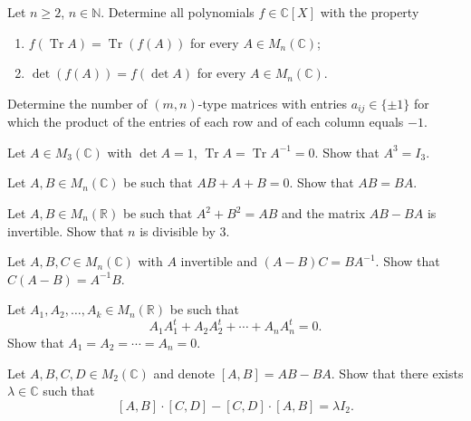 \documentclass[12pt]{article}
\begin{document}
\begin{problem}
Let $n \ge 2$, $n \in \mathbb{N}$. Determine all polynomials $f \in \mathbb{C}[X]$ with the property
\begin{enumerate}[label=(\alph*)]
\item $f(\operatorname{Tr} A) = \operatorname{Tr}(f(A))$ for every $A \in M_n(\mathbb{C})$;
\item $\det(f(A)) = f(\det A)$ for every $A \in M_n(\mathbb{C})$.
\end{enumerate}
\end{problem}

\begin{problem}
Determine the number of $(m,n)$-type matrices with entries $a_{ij} \in \{\pm 1\}$ for which the product of the entries of each row and of each column equals $-1$.
\end{problem}

\begin{problem}
Let $A \in M_3(\mathbb{C})$ with $\det A = 1$, $\operatorname{Tr} A = \operatorname{Tr} A^{-1} = 0$. Show that $A^3 = I_3$.
\end{problem}

\begin{problem}
Let $A, B \in M_n(\mathbb{C})$ be such that $AB + A + B = 0$. Show that $AB = BA$.
\end{problem}

\begin{problem}
Let $A, B \in M_n(\mathbb{R})$ be such that $A^2 + B^2 = AB$ and the matrix $AB - BA$ is invertible. Show that $n$ is divisible by $3$.
\end{problem}

\begin{problem}
Let $A, B, C \in M_n(\mathbb{C})$ with $A$ invertible and $(A-B)C = BA^{-1}$. Show that $C(A-B) = A^{-1}B$.
\end{problem}

\begin{problem}
Let $A_1, A_2, \ldots, A_k \in M_n(\mathbb{R})$ be such that
$$A_1 A_1^t + A_2 A_2^t + \cdots + A_n A_n^t = 0.$$
Show that $A_1 = A_2 = \cdots = A_n = 0$.
\end{problem}

\begin{problem}
Let $A, B, C, D \in M_2(\mathbb{C})$ and denote $[A,B] = AB - BA$. Show that there exists $\lambda \in \mathbb{C}$ such that
$$[A,B]\cdot[C,D] - [C,D]\cdot[A,B] = \lambda I_2.$$
\end{problem}
\end{document}
